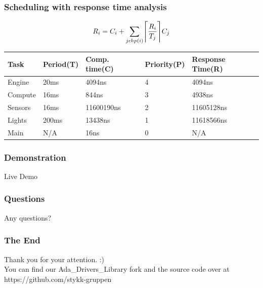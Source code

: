 \documentclass{beamer}
\DeclarePairedDelimiter{\ceil}{\lceil}{\rceil}
\begin{document}
    \begin{frame}
        \centering
        \frametitle{Scheduling with response time analysis}

        \begin{equation*}
            R_{i} = C_{i} + \sum_{j \epsilon hp(i)} \ceil[\Bigg]{\frac{R_{i}}{T_{j}}} C_{j}
        \end{equation*}
        \begin{table}
            \begin{adjustbox}{width=\columnwidth, center}
            \begin{tabular}{||l l l l|l||}
                \hline
                Task & Period(T) & Comp. time(C) & Priority(P) & Response Time(R) \\ 
                \hline\hline
                Engine & 20ms & 4094ns & 4 & 4094ns \\
                \hline
                Compute & 16ms & 844ns & 3 & 4938ns \\
                \hline
                Sensors & 16ms & 11600190ns & 2 & 11605128ns \\
                \hline
                Lights & 200ms & 13438ns & 1 & 11618566ns \\
                \hline
                Main & N/A & 16ns & 0 & N/A \\ 
                \hline
            \end{tabular}
            \end{adjustbox}
        \end{table}
    \end{frame}

    \begin{frame}
        \centering
        \frametitle{Demonstration}
        Live Demo
    \end{frame}

    \begin{frame} 
        \centering
        \frametitle{Questions}
        Any questions?
    \end{frame}

    \begin{frame}
        \centering
        \frametitle{The End}
        Thank you for your attention. :)\\
        You can find our Ada\_Drivers\_Library fork and the source code over at https://github.com/stykk-gruppen
    \end{frame}
\end{document}
